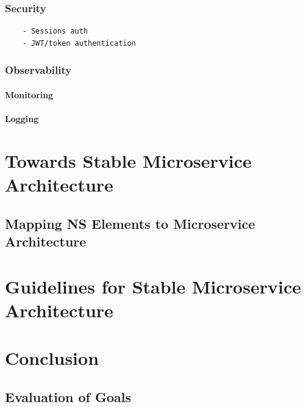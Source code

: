 \documentclass[thesis=M,english,hidelinks]{FITthesis}[2012/10/20]
\begin{document}
\subsection{Security}
\begin{verbatim}
    - Sessions auth
    - JWT/token authentication
\end{verbatim}


\subsection{Observability}
\subsubsection{Monitoring}
\subsubsection{Logging}


% 
% 

\chapter{Towards Stable Microservice Architecture}
\label{sec:msa_compliance}
\section{Mapping NS Elements to Microservice Architecture}


\chapter{Guidelines for Stable Microservice Architecture}
\label{sec:guidelines}

% 
% 
\chapter{Conclusion}
\label{sec:conclusion}
\section{Evaluation of Goals}
\end{document}
